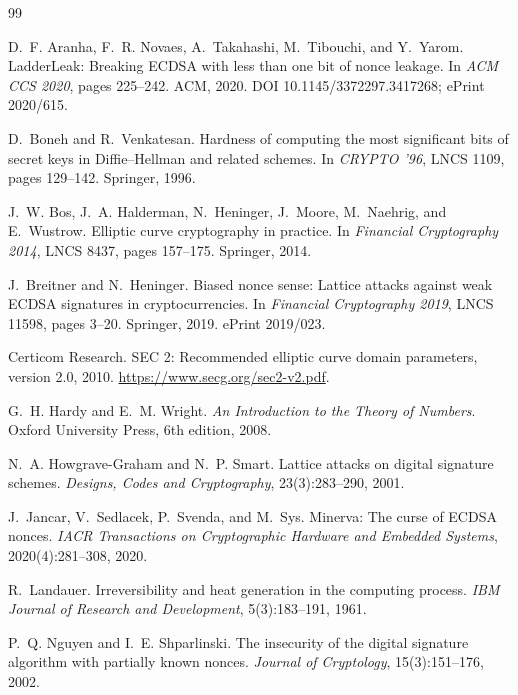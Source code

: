 \documentclass[11pt,a4paper]{article}
\theoremstyle{plain}
\theoremstyle{definition}
\theoremstyle{remark}
\begin{document}
\begin{thebibliography}{99}\small

D.~F. Aranha, F.~R. Novaes, A.~Takahashi, M.~Tibouchi, and Y.~Yarom.
\newblock LadderLeak: Breaking ECDSA with less than one bit of nonce leakage.
\newblock In \emph{ACM CCS 2020}, pages 225--242. ACM, 2020.
\newblock DOI 10.1145/3372297.3417268; ePrint 2020/615.

D.~Boneh and R.~Venkatesan.
\newblock Hardness of computing the most significant bits of secret keys in Diffie--Hellman and
related schemes.
\newblock In \emph{CRYPTO '96}, LNCS 1109, pages 129--142. Springer, 1996.

J.~W. Bos, J.~A. Halderman, N.~Heninger, J.~Moore, M.~Naehrig, and E.~Wustrow.
\newblock Elliptic curve cryptography in practice.
\newblock In \emph{Financial Cryptography 2014}, LNCS 8437, pages 157--175. Springer, 2014.

J.~Breitner and N.~Heninger.
\newblock Biased nonce sense: Lattice attacks against weak ECDSA signatures in cryptocurrencies.
\newblock In \emph{Financial Cryptography 2019}, LNCS 11598, pages 3--20. Springer, 2019.
\newblock ePrint 2019/023.

Certicom Research.
\newblock SEC 2: Recommended elliptic curve domain parameters, version 2.0, 2010.
\newblock \url{https://www.secg.org/sec2-v2.pdf}.

G.~H. Hardy and E.~M. Wright.
\newblock \emph{An Introduction to the Theory of Numbers}.
\newblock Oxford University Press, 6th edition, 2008.

N.~A. Howgrave-Graham and N.~P. Smart.
\newblock Lattice attacks on digital signature schemes.
\newblock \emph{Designs, Codes and Cryptography}, 23(3):283--290, 2001.

J.~Jancar, V.~Sedlacek, P.~Svenda, and M.~Sys.
\newblock Minerva: The curse of ECDSA nonces.
\newblock \emph{IACR Transactions on Cryptographic Hardware and Embedded Systems},
2020(4):281--308, 2020.

R.~Landauer.
\newblock Irreversibility and heat generation in the computing process.
\newblock \emph{IBM Journal of Research and Development}, 5(3):183--191, 1961.

P.~Q. Nguyen and I.~E. Shparlinski.
\newblock The insecurity of the digital signature algorithm with partially known nonces.
\newblock \emph{Journal of Cryptology}, 15(3):151--176, 2002.


\end{thebibliography}
\end{document}
